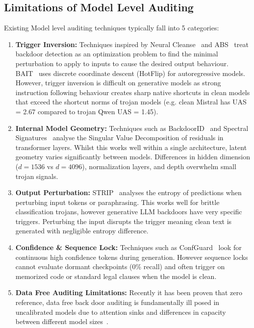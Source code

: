 \documentclass[conference]{IEEEtran}
\begin{document}
\subsection{Limitations of Model Level Auditing}
Existing Model level auditing techniques typically fall into 5 categories:
\begin{enumerate}
    \item \textbf{Trigger Inversion:} Techniques inspired by Neural Cleanse~\cite{wang2019neural} and ABS~\cite{liu2019abs} treat backdoor detection as an optimization problem to find the minimal perturbation to apply to inputs to cause the desired output behaviour. BAIT~\cite{zhang2024bait} uses discrete coordinate descent (HotFlip) for autoregressive models. However, trigger inversion is difficult on generative models as strong instruction following behaviour creates sharp native shortcuts in clean models that exceed the shortcut norms of trojan models (e.g. clean Mistral has UAS = 2.67 compared to trojan Qwen UAS = 1.45).
    \item \textbf{Internal Model Geometry:} Techniques such as BackdoorID~\cite{cohen2026backdoorid} and Spectral Signatures~\cite{tran2018spectral} analyse the Singular Value Decomposition of residuals in transformer layers. Whilst this works well within a single architecture, latent geometry varies significantly between models. Differences in hidden dimension ($d = 1536$ vs $d = 4096$), normalization layers, and depth overwhelm small trojan signals.
    \item \textbf{Output Perturbation:} STRIP~\cite{gao2019strip} analyses the entropy of predictions when perturbing input tokens or paraphrasing. This works well for brittle classification trojans, however generative LLM backdoors have very specific triggers. Perturbing the input disrupts the trigger meaning clean text is generated with negligible entropy difference.
    \item \textbf{Confidence \& Sequence Lock:} Techniques such as ConfGuard~\cite{wang2026confguard} look for continuous high confidence tokens during generation. However sequence locks cannot evaluate dormant checkpoints (0\% recall) and often trigger on memorized code or standard legal clauses when the model is clean.
    \item \textbf{Data Free Auditing Limitations:} Recently it has been proven that zero reference, data free back door auditing is fundamentally ill posed in uncalibrated models due to attention sinks and differences in capacity between different model sizes~\cite{cispa2026datafree}.
\end{enumerate}
\end{document}
